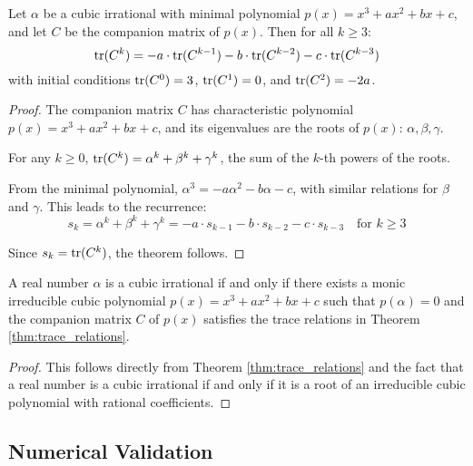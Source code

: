 \begin{theorem}\label{thm:trace_relations}
Let $\alpha$ be a cubic irrational with minimal polynomial $p(x) = x^3 + ax^2 + bx + c$, and let $C$ be the companion matrix of $p(x)$. Then for all $k \geq 3$:
\begin{equation}
\operatorname{tr}(C^k) = -a \cdot \operatorname{tr}(C^{k-1}) - b \cdot \operatorname{tr}(C^{k-2}) - c \cdot \operatorname{tr}(C^{k-3})
\end{equation}
with initial conditions $\operatorname{tr}(C^0) = 3$, $\operatorname{tr}(C^1) = 0$, and $\operatorname{tr}(C^2) = -2a$.
\end{theorem}

\begin{proof}
The companion matrix $C$ has characteristic polynomial $p(x) = x^3 + ax^2 + bx + c$, and its eigenvalues are the roots of $p(x)$: $\alpha, \beta, \gamma$.

For any $k \geq 0$, $\operatorname{tr}(C^k) = \alpha^k + \beta^k + \gamma^k$, the sum of the $k$-th powers of the roots.

From the minimal polynomial, $\alpha^3 = -a\alpha^2 - b\alpha - c$, with similar relations for $\beta$ and $\gamma$. This leads to the recurrence:
\begin{equation}
s_k = \alpha^k + \beta^k + \gamma^k = -a \cdot s_{k-1} - b \cdot s_{k-2} - c \cdot s_{k-3} \quad \text{for } k \geq 3
\end{equation}

Since $s_k = \operatorname{tr}(C^k)$, the theorem follows.
\end{proof}

\begin{corollary}\label{cor:matrix_characterization}
A real number $\alpha$ is a cubic irrational if and only if there exists a monic irreducible cubic polynomial $p(x) = x^3 + ax^2 + bx + c$ such that $p(\alpha) = 0$ and the companion matrix $C$ of $p(x)$ satisfies the trace relations in Theorem \ref{thm:trace_relations}.
\end{corollary}

\begin{proof}
This follows directly from Theorem \ref{thm:trace_relations} and the fact that a real number is a cubic irrational if and only if it is a root of an irreducible cubic polynomial with rational coefficients.
\end{proof}

\subsection{Numerical Validation}

